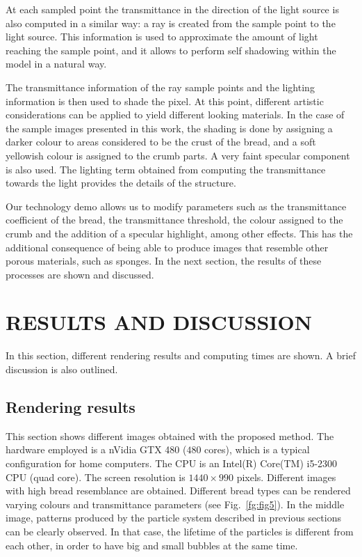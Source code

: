 \documentclass[oneside,a4paper,english,links]{amca}
\begin{document}
At each sampled point the transmittance in the direction of the light
source is also computed in a similar way: a ray is created from the
sample point to the light source. This information is used to
approximate the amount of light reaching the sample point, and it
allows to perform self shadowing within the model in a natural
way. 

The transmittance information of the ray sample points and the
lighting information is then used to shade the pixel. At this point,
different artistic considerations can be applied to yield different
looking materials. In the case of the sample images presented
in this work, the shading is done by assigning a darker colour to areas
considered to be the crust of the bread, and a soft yellowish colour is
assigned to the crumb parts. A very faint specular component is also
used. The lighting term obtained from computing the transmittance
towards the light provides the details of the structure.

Our technology demo allows us to modify parameters such as the
transmittance coefficient of the bread, the transmittance threshold,
the colour assigned to the crumb and the addition of a specular
highlight, among other effects. This has the additional consequence of
being able to produce images that resemble other porous materials,
such as sponges. In the next section, the results of these processes
are shown and discussed.

\section{RESULTS AND DISCUSSION}

In this section, different rendering results and computing times are shown. A brief discussion is also outlined.

\subsection{Rendering results}

This section shows different images obtained with the proposed
method. The hardware employed is a nVidia GTX 480 ($480$ cores), which
is a typical configuration for home computers. The CPU is an Intel(R)
Core(TM) i5-2300 CPU (quad core). The screen resolution is
$1440\times990$ pixels. Different images with high bread resemblance
are obtained. Different bread types can be rendered varying colours
and transmittance parameters (see Fig.~\ref{fg:fig5}). In the middle
image, patterns produced by the particle system described in previous
sections can be clearly observed. In that case, the lifetime of the
particles is different from each other, in order to have big and small
bubbles at the same time. 
\end{document}
